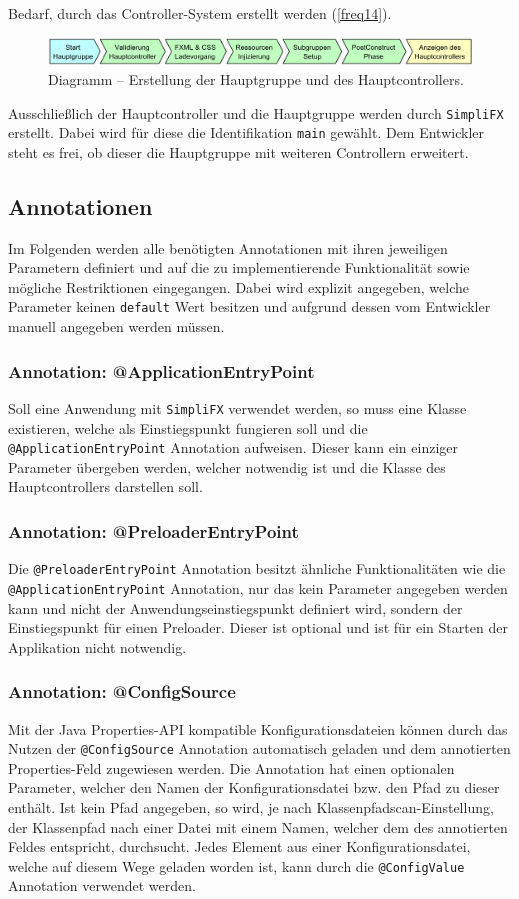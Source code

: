 Bedarf, durch das Controller-System erstellt werden (\autoref{freq14}).
\begin{figure}[H]
	\centering
	\includegraphics[width=\textwidth]{Abbildungen/Controller Erstellungsprozess.png}
	\caption{Diagramm -- Erstellung der Hauptgruppe und des Hauptcontrollers.}
	\label{fig:controller_init}
\end{figure}
\noindent Ausschließlich der Hauptcontroller und die Hauptgruppe werden durch \texttt{SimpliFX} erstellt. Dabei wird für diese die Identifikation \texttt{main} gewählt. Dem Entwickler steht es frei, ob dieser die Hauptgruppe mit weiteren Controllern erweitert.
\subsection{Annotationen}
\label{annotations}
Im Folgenden werden alle benötigten Annotationen mit ihren jeweiligen Parametern definiert und auf die zu implementierende Funktionalität sowie mögliche Restriktionen eingegangen. Dabei wird explizit angegeben, welche Parameter keinen \texttt{default} Wert besitzen und aufgrund dessen vom Entwickler manuell angegeben werden müssen.
\subsubsection{Annotation: @ApplicationEntryPoint}
Soll eine Anwendung mit \texttt{SimpliFX} verwendet werden, so muss eine Klasse existieren, welche als Einstiegspunkt fungieren soll und die \texttt{@ApplicationEntryPoint} Annotation aufweisen. Dieser kann ein einziger Parameter übergeben werden, welcher notwendig ist und die Klasse des Hauptcontrollers darstellen soll.
\subsubsection{Annotation: @PreloaderEntryPoint}
Die \texttt{@PreloaderEntryPoint} Annotation besitzt ähnliche Funktionalitäten wie die \texttt{@ApplicationEntryPoint} Annotation, nur das kein Parameter angegeben werden kann und nicht der Anwendungseinstiegspunkt definiert wird, sondern der Einstiegspunkt für einen Preloader. Dieser ist optional und ist für ein Starten der Applikation nicht notwendig.
\subsubsection{Annotation: @ConfigSource}
Mit der Java Properties-API kompatible Konfigurationsdateien können durch das Nutzen der \texttt{@ConfigSource} Annotation automatisch geladen und dem annotierten Properties-Feld zugewiesen werden. Die Annotation hat einen optionalen Parameter, welcher den Namen der Konfigurationsdatei bzw. den Pfad zu dieser enthält. Ist kein Pfad angegeben, so wird, je nach Klassenpfadscan-Einstellung, der Klassenpfad nach einer Datei mit einem Namen, welcher dem des annotierten Feldes entspricht, durchsucht. Jedes Element aus einer Konfigurationsdatei, welche auf diesem Wege geladen worden ist, kann durch die \texttt{@ConfigValue} Annotation verwendet werden.
